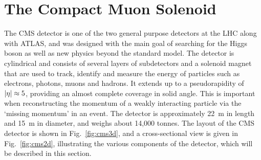 \section{The Compact Muon Solenoid}
The CMS detector is one of the two general purpose detectors at the LHC along 
with ATLAS, and was designed with the main goal of searching for the Higgs 
boson as well as new physics beyond the standard model. The detector is 
cylindrical 
and consists of several layers of subdetectors and a solenoid magnet that are 
used to track, identify and measure the energy of particles such as electrons, 
photons, muons and hadrons. 
It extends up to a pseudorapidity of $|\eta| \approx 5$, providing an almost 
complete coverage in solid angle. This is important when reconstructing the 
momentum of a weakly interacting particle via the `missing momentum' in an 
event.
The detector is approximately 22~m in length and 15~m in diameter, and weighs 
about 14,000 tonnes.
The layout of the CMS detector is shown in Fig.~\ref{fig:cms3d}, and a 
cross-sectional view is given in Fig.~\ref{fig:cms2d}, illustrating the various 
components of the detector, which will be described in this section.

